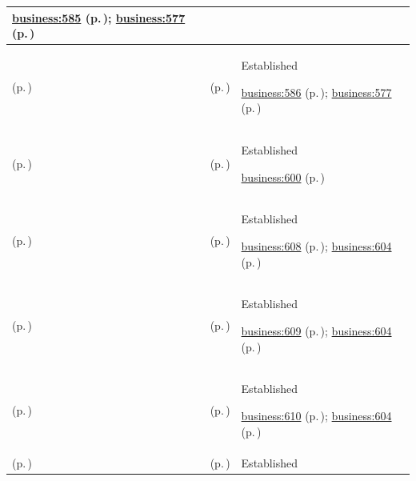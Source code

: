 \begin{longtable}{|>{\raggedright\arraybackslash}p{0.27\TableWidth}|>{\raggedright\arraybackslash}p{0.27\TableWidth}|>{\raggedright\arraybackslash}p{0.46\TableWidth}|}
 \hyperref[rad:business:579]{business:585} (p.\,\pageref{rad:business:579}); \hyperref[rad:business:577]{business:577} (p.\,\pageref{rad:business:577})\\\hline
\nameref{cap:bc-preventative-health} (p.\,\pageref{cap:bc-preventative-health}) & \nameref{cap:bc-preventative-health-cohort-management} (p.\,\pageref{cap:bc-preventative-health-cohort-management}) & Established

 \hyperref[rad:business:579]{business:586} (p.\,\pageref{rad:business:579}); \hyperref[rad:business:577]{business:577} (p.\,\pageref{rad:business:577})\\\hline
\nameref{cap:bc-population-health-health-system-planning} (p.\,\pageref{cap:bc-population-health-health-system-planning}) & \nameref{cap:bc-population-health-surveillance} (p.\,\pageref{cap:bc-population-health-surveillance}) & Established

 \hyperref[rad:business:600]{business:600} (p.\,\pageref{rad:business:600})\\\hline
\nameref{cap:bc-population-health-surveillance} (p.\,\pageref{cap:bc-population-health-surveillance}) & \nameref{cap:bc-population-health-longitudinal-assessment} (p.\,\pageref{cap:bc-population-health-longitudinal-assessment}) & Established

 \hyperref[rad:business:606]{business:608} (p.\,\pageref{rad:business:606}); \hyperref[rad:business:604]{business:604} (p.\,\pageref{rad:business:604})\\\hline
\nameref{cap:bc-population-health-surveillance} (p.\,\pageref{cap:bc-population-health-surveillance}) & \nameref{cap:bc-population-health-surveillance-management} (p.\,\pageref{cap:bc-population-health-surveillance-management}) & Established

 \hyperref[rad:business:606]{business:609} (p.\,\pageref{rad:business:606}); \hyperref[rad:business:604]{business:604} (p.\,\pageref{rad:business:604})\\\hline
\nameref{cap:bc-population-health-surveillance} (p.\,\pageref{cap:bc-population-health-surveillance}) & \nameref{cap:bc-population-health-event-identification} (p.\,\pageref{cap:bc-population-health-event-identification}) & Established

 \hyperref[rad:business:606]{business:610} (p.\,\pageref{rad:business:606}); \hyperref[rad:business:604]{business:604} (p.\,\pageref{rad:business:604})\\\hline
\nameref{cap:bc-population-health-surveillance} (p.\,\pageref{cap:bc-population-health-surveillance}) & \nameref{cap:bc-notifiable-health-event-management} (p.\,\pageref{cap:bc-notifiable-health-event-management}) & Established


\end{longtable}
